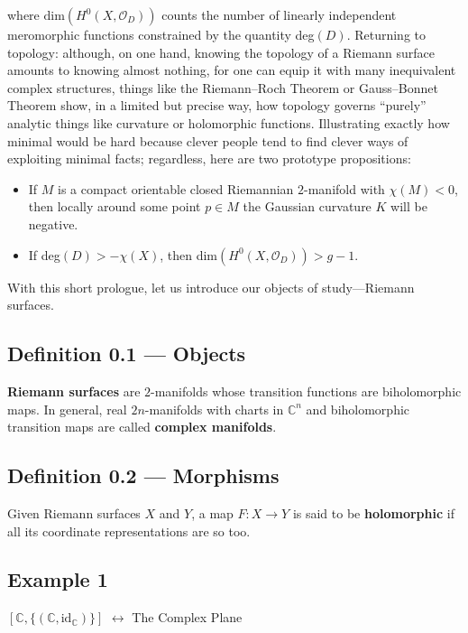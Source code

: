 \documentclass[11pt,a4paper]{article}
\begin{document}
where $\text{dim}(H^0(X, \mathcal{O}_D))$ counts the number of linearly independent meromorphic functions constrained by the quantity deg$(D)$. Returning to topology: although, on one hand, knowing the topology of a Riemann surface amounts to knowing almost nothing, for one can equip it with many inequivalent complex structures, things like the Riemann--Roch Theorem or Gauss--Bonnet Theorem show, in a limited but precise way, how topology governs ``purely'' analytic things like curvature or holomorphic functions. Illustrating exactly how minimal would be hard because clever people tend to find clever ways of exploiting minimal facts; regardless, here are two prototype propositions:

\begin{itemize}
    \item If $M$ is a compact orientable closed Riemannian $2$-manifold with $\chi(M) <0$, then locally around some point $p\in M$ the Gaussian curvature $K$ will be negative.
    \item If deg$(D) > -\chi(X)$, then dim$(H^0(X, \mathcal{O}_D)) > g-1$.
\end{itemize}

With this short prologue, let us introduce our objects of study---Riemann surfaces.

\subsection*{Definition 0.1 — Objects} \textbf{Riemann surfaces} are $2$-manifolds whose transition functions are biholomorphic maps. In general, real $2n$-manifolds with charts in $\mathbb C^n$ and biholomorphic transition maps are called \textbf{complex manifolds}.


\subsection*{Definition 0.2 — Morphisms} Given Riemann surfaces $X$ and $Y$, a map $F: X\rightarrow Y$ is said to be \textbf{holomorphic} if all its coordinate representations are so too.


\subsection*{Example 1} $[\mathbb{C}, \{(\mathbb{C}, \text{id}_{\mathbb{C}})\}]$ $\longleftrightarrow$ The Complex Plane
\end{document}
